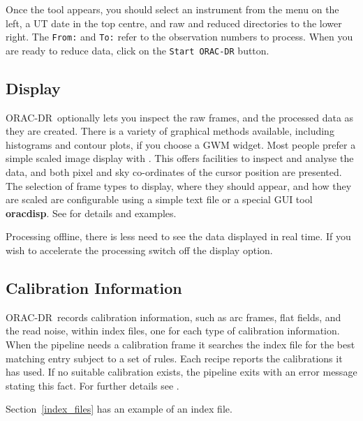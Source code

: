 \documentclass[twoside,11pt,nolof]{starlink}
\providecommand{\GAIA}{{\footnotesize GAIA}}
\providecommand{\KAPPA}{{\footnotesize KAPPA}}
\providecommand{\ORACDR}{{\footnotesize ORAC-DR}}
\begin{document}
Once the tool appears, you should select an instrument from the menu on
the left, a UT date in the top centre, and raw and reduced directories
to the lower right.   The \texttt{From:} and \texttt{To:} refer to the
observation numbers to process.  When you are ready to reduce data,
click on the \texttt{Start ORAC-DR} button.

\subsection{Display\label{display}}

\ORACDR\ optionally lets you inspect the raw frames, and the processed
data as they are created.  There is a variety of graphical
methods available, including histograms and contour plots, if you
choose a \xref{\KAPPA}{sun95}{} GWM widget.  Most people prefer a
simple scaled image display with \xref{\GAIA}{sun214}{}.  This offers
facilities to inspect and analyse the data, and both pixel and sky
co-ordinates of the cursor position are presented.  The selection of
frame types to display, where they should appear, and how they are
scaled are configurable using a simple text file or a special GUI tool
\textbf{oracdisp}.  See  for details
and examples.

Processing offline, there is less need to see the data displayed in real time.
If you wish to accelerate the processing switch off the display option.

\begin{terminalv}
\end{terminalv}

\subsection{Calibration Information\label{calibration_information}}

\ORACDR\ records calibration information, such as arc frames, flat
fields, and the read noise, within index files, one for each type of
calibration information.  When the pipeline needs a calibration frame
it searches the index file for the best matching entry subject to a
set of rules. Each recipe reports the calibrations it has used.  If no
suitable calibration exists, the pipeline exits with an error message
stating this fact.  For further details see
.


\begin{latexonly}
Section~\ref{index_files} has an example of an index file.
\end{latexonly}
\end{document}

